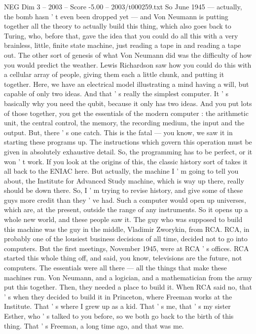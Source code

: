 \begin{textsample}{NEG Dim 3 – 2003 – Score -5.00 – 2003/t000259.txt}
So June 1945 — actually, the bomb hasn ' t even been dropped yet — and Von Neumann is putting together all the theory to actually build this thing, which also goes back to Turing, who, before that, gave the idea that you could do all this with a very brainless, little, finite state machine, just reading a tape in and reading a tape out.
The other sort of genesis of what Von Neumann did was the difficulty of how you would predict the weather.
Lewis Richardson saw how you could do this with a cellular array of people, giving them each a little chunk, and putting it together.
Here, we have an electrical model illustrating a mind having a will, but capable of only two ideas.
And that ' s really the simplest computer.
It ' s basically why you need the qubit, because it only has two ideas.
And you put lots of those together, you get the essentials of the modern computer : the arithmetic unit, the central control, the memory, the recording medium, the input and the output.
But, there ' s one catch.
This is the fatal — you know, we saw it in starting these programs up.
The instructions which govern this operation must be given in absolutely exhaustive detail.
So, the programming has to be perfect, or it won ' t work.
If you look at the origins of this, the classic history sort of takes it all back to the ENIAC here.
But actually, the machine I ' m going to tell you about, the Institute for Advanced Study machine, which is way up there, really should be down there.
So, I ' m trying to revise history, and give some of these guys more credit than they ' ve had.
Such a computer would open up universes, which are, at the present, outside the range of any instruments.
So it opens up a whole new world, and these people saw it.
The guy who was supposed to build this machine was the guy in the middle, Vladimir Zworykin, from RCA.
RCA, in probably one of the lousiest business decisions of all time, decided not to go into computers.
But the first meetings, November 1945, were at RCA ' s offices.
RCA started this whole thing off, and said, you know, televisions are the future, not computers.
The essentials were all there — all the things that make these machines run.
Von Neumann, and a logician, and a mathematician from the army put this together.
Then, they needed a place to build it.
When RCA said no, that ' s when they decided to build it in Princeton, where Freeman works at the Institute.
That ' s where I grew up as a kid.
That ' s me, that ' s my sister Esther, who ' s talked to you before, so we both go back to the birth of this thing.
That ' s Freeman, a long time ago, and that was me.

\end{textsample}
